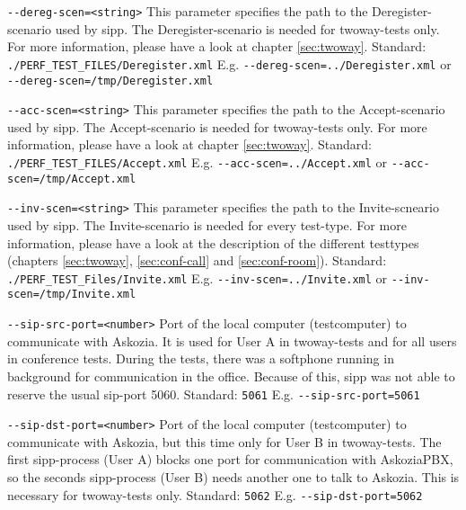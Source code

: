 \begin{description}
\item {\texttt{-{}-dereg-scen=<string>}} \newline
This parameter specifies the path to the Deregister-scenario used by sipp.
The Deregister-scenario is needed for twoway-tests only.
For more information, please have a look at chapter \ref{sec:twoway}.
\newline Standard: \texttt{./PERF\_TEST\_FILES/Deregister.xml}
\newline E.g. \texttt{-{}-dereg-scen=../Deregister.xml} or \texttt{-{}-dereg-scen=/tmp/Deregister.xml}

\item {\texttt{-{}-acc-scen=<string>}} \newline
This parameter specifies the path to the Accept-scenario used by sipp.
The Accept-scenario is needed for twoway-tests only.
For more information, please have a look at chapter \ref{sec:twoway}.
\newline Standard: \texttt{./PERF\_TEST\_FILES/Accept.xml}
\newline E.g. \texttt{-{}-acc-scen=../Accept.xml} or \texttt{-{}-acc-scen=/tmp/Accept.xml}

\item {\texttt{-{}-inv-scen=<string>}} \newline
This parameter specifies the path to the Invite-scneario used by sipp.
The Invite-scenario is needed for every test-type.
For more information, please have a look at the description of the
different testtypes (chapters \ref{sec:twoway}, \ref{sec:conf-call} and \ref{sec:conf-room}).
\newline Standard: \texttt{./PERF\_TEST\_Files/Invite.xml}
\newline E.g. \texttt{-{}-inv-scen=../Invite.xml} or \texttt{-{}-inv-scen=/tmp/Invite.xml}

\item {\texttt{-{}-sip-src-port=<number>}} \newline
Port of the local computer (testcomputer) to communicate with Askozia.
It is used for User A in twoway-tests and for all users in conference tests.
During the tests, there was a softphone running in background for communication
in the office. Because of this, sipp was not able to reserve the usual sip-port 5060.
\newline Standard: \texttt{5061}
\newline E.g. \texttt{-{}-sip-src-port=5061}

\item {\texttt{-{}-sip-dst-port=<number>}} \newline
Port of the local computer (testcomputer) to communicate with Askozia,
but this time only for User B in twoway-tests. The first sipp-process
(User A) blocks one port for communication with AskoziaPBX,
so the seconds sipp-process (User B) needs another one to talk to Askozia.
This is necessary for twoway-tests only.
\newline Standard: \texttt{5062}
\newline E.g. \texttt{-{}-sip-dst-port=5062}


\end{description}
